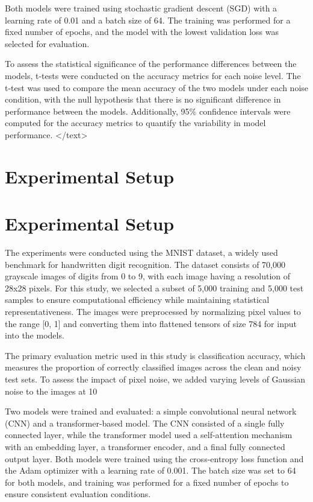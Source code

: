\documentclass{article}
\begin{document}
Both models were trained using stochastic gradient descent (SGD) with a learning rate of 0.01 and a batch size of 64. The training was performed for a fixed number of epochs, and the model with the lowest validation loss was selected for evaluation.

To assess the statistical significance of the performance differences between the models, t-tests were conducted on the accuracy metrics for each noise level. The t-test was used to compare the mean accuracy of the two models under each noise condition, with the null hypothesis that there is no significant difference in performance between the models. Additionally, 95\% confidence intervals were computed for the accuracy metrics to quantify the variability in model performance.
</text>
\section{Experimental Setup}
\section{Experimental Setup}

The experiments were conducted using the MNIST dataset, a widely used benchmark for handwritten digit recognition. The dataset consists of 70,000 grayscale images of digits from 0 to 9, with each image having a resolution of 28x28 pixels. For this study, we selected a subset of 5,000 training and 5,000 test samples to ensure computational efficiency while maintaining statistical representativeness. The images were preprocessed by normalizing pixel values to the range [0, 1] and converting them into flattened tensors of size 784 for input into the models.

The primary evaluation metric used in this study is classification accuracy, which measures the proportion of correctly classified images across the clean and noisy test sets. To assess the impact of pixel noise, we added varying levels of Gaussian noise to the images at 10%

Two models were trained and evaluated: a simple convolutional neural network (CNN) and a transformer-based model. The CNN consisted of a single fully connected layer, while the transformer model used a self-attention mechanism with an embedding layer, a transformer encoder, and a final fully connected output layer. Both models were trained using the cross-entropy loss function and the Adam optimizer with a learning rate of 0.001. The batch size was set to 64 for both models, and training was performed for a fixed number of epochs to ensure consistent evaluation conditions.
\end{document}

